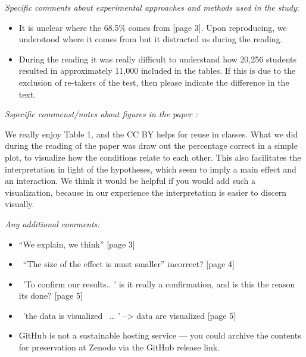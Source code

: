 \documentclass[10pt]{article}
\providecommand{\tightlist}{\setlength{\itemsep}{0pt}\setlength{\parskip}{0pt}}%
\begin{document}
\emph{Specific comments about experimental approaches and methods used
in the study}:

\begin{itemize}
\tightlist
\item
  It is unclear where the 68.5\% comes from {[}page 3{]}. Upon
  reproducing, we understood where it comes from but it distracted us
  during the reading.
\item
  During the reading it was really difficult to understand how 20,256
  students resulted in approximately 11,000 included in the tables. If
  this is due to the exclusion of re-takers of the test, then please
  indicate the difference in the text.
\end{itemize}

\par\null

\emph{Sspecific commenst/notes about figures in the paper :}

We really enjoy Table 1, and the CC BY helps for reuse in classes. What
we did during the reading of the paper was draw out the percentage
correct in a simple plot, to visualize how the conditions relate to each
other. This also facilitates the interpretation in light of the
hypotheses, which seem to imply a main effect and an interaction. We
think it would be helpful if you would add such a visualization, because
in our experience the interpretation is easier to discern visually.~

\emph{Any additional comments:}

\begin{itemize}
\tightlist
\item
  ``We explain, we think'' {[}page 3{]}
\item
  ~``The size of the effect is must smaller'' incorrect? {[}page 4{]}
\item
  ~'To confirm our results.. ' is it really a confirmation, and is this
  the reason its done? {[}page 5{]}
\item
  ~'the data is visualized~ \ldots{} ' --\textgreater{} data are
  visualized {[}page 5{]}
\item
  GitHub is not a sustainable hosting service --- you could archive the
  contents for preservation at Zenodo via the GitHub release link.
\end{itemize}

\FloatBarrier
\end{document}
